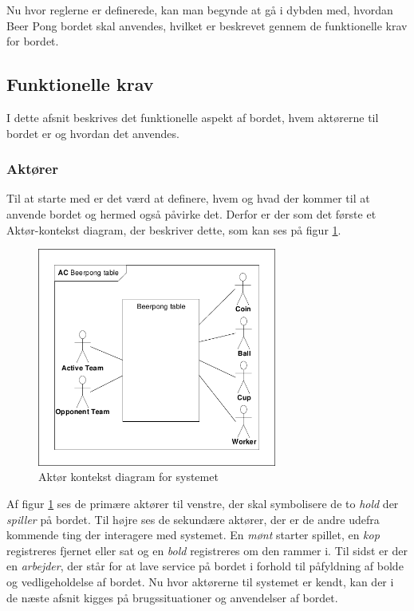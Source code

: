 \documentclass[Rapport/Rapport_main.tex]{subfiles}
\begin{document}
Nu hvor reglerne er definerede, kan man begynde at gå i dybden med, hvordan Beer Pong bordet skal anvendes, hvilket er beskrevet gennem de funktionelle krav for bordet.

\subsection{Funktionelle krav}
I dette afsnit beskrives det funktionelle aspekt af bordet, hvem aktørerne til bordet er og hvordan det anvendes.
\subsubsection{Aktører}
Til at starte med er det værd at definere, hvem og hvad der kommer til at anvende bordet og hermed også påvirke det. Derfor er der som det første et Aktør-kontekst diagram, der beskriver dette, som kan ses på figur \ref{fig:rap_actor_context}.
\begin{figure}[H]
    \centering
    \includegraphics[width=0.7\textwidth,trim={0.24in 0.24in 0.24in 0.24in},clip, page=1]{Kravspecifikation/Funktionelle_krav/graphics_funktionel/Krav-spec-diagrammer.pdf}
    \caption{Aktør kontekst diagram for systemet}
    \label{fig:rap_actor_context}
\end{figure}
Af figur \ref{fig:rap_actor_context} ses de primære aktører til venstre, der skal symbolisere de to \textit{hold} der \textit{spiller} på bordet. Til højre ses de sekundære aktører, der er de andre udefra kommende ting der interagere med systemet. En \textit{mønt} starter spillet, en \textit{kop} registreres fjernet eller sat og en \textit{bold} registreres om den rammer i. Til sidst er der en \textit{arbejder}, der står for at lave service på bordet i forhold til påfyldning af bolde og vedligeholdelse af bordet. Nu hvor aktørerne til systemet er kendt, kan der i de næste afsnit kigges på brugssituationer og anvendelser af bordet.
\end{document}
